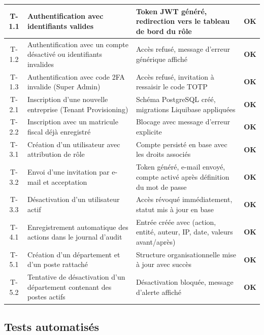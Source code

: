 \begin{small}
\begin{xltabular}{\textwidth}{|c|>{\raggedright\arraybackslash}X|>{\raggedright\arraybackslash}p{4cm}|c|}
T-1.1 & Authentification avec identifiants valides
& Token JWT généré, redirection vers le tableau de bord du rôle
& \textcolor{green!60!black}{\textbf{OK}} \\ \hline
T-1.2 & Authentification avec un compte désactivé ou identifiants invalides
& Accès refusé, message d'erreur générique affiché
& \textcolor{green!60!black}{\textbf{OK}} \\ \hline
T-1.3 & Authentification avec code 2FA invalide (Super Admin)
& Accès refusé, invitation à ressaisir le code TOTP
& \textcolor{green!60!black}{\textbf{OK}} \\ \hline
T-2.1 & Inscription d'une nouvelle entreprise (Tenant Provisioning)
& Schéma PostgreSQL créé, migrations Liquibase appliquées
& \textcolor{green!60!black}{\textbf{OK}} \\ \hline
T-2.2 & Inscription avec un matricule fiscal déjà enregistré
& Blocage avec message d'erreur explicite
& \textcolor{green!60!black}{\textbf{OK}} \\ \hline
T-3.1 & Création d'un utilisateur avec attribution de rôle
& Compte persisté en base avec les droits associés
& \textcolor{green!60!black}{\textbf{OK}} \\ \hline
T-3.2 & Envoi d'une invitation par e-mail et acceptation
& Token généré, e-mail envoyé, compte activé après définition du mot de passe
& \textcolor{green!60!black}{\textbf{OK}} \\ \hline
T-3.3 & Désactivation d'un utilisateur actif
& Accès révoqué immédiatement, statut mis à jour en base
& \textcolor{green!60!black}{\textbf{OK}} \\ \hline
T-4.1 & Enregistrement automatique des actions dans le journal d'audit
& Entrée créée avec (action, entité, auteur, IP, date, valeurs avant/après)
& \textcolor{green!60!black}{\textbf{OK}} \\ \hline
T-5.1 & Création d'un département et d'un poste rattaché
& Structure organisationnelle mise à jour avec succès
& \textcolor{green!60!black}{\textbf{OK}} \\ \hline
T-5.2 & Tentative de désactivation d'un département contenant des postes actifs
& Désactivation bloquée, message d'alerte affiché
& \textcolor{green!60!black}{\textbf{OK}} \\ \hline
\end{xltabular}
\end{small}
\renewcommand{\arraystretch}{1.0}

\subsection{Tests automatisés}


